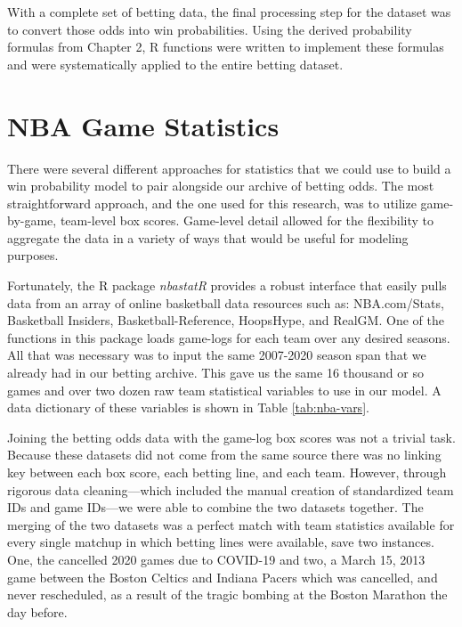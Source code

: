 \documentclass [MS] {uclathes}
\begin{document}
With a complete set of betting data, the final processing step for the dataset was to convert those odds into win probabilities. Using the derived probability formulas from Chapter 2, R functions were written to implement these formulas and were systematically applied to the entire betting dataset. 

\section{NBA Game Statistics}
There were several different approaches for statistics that we could use to build a win probability model to pair alongside our archive of betting odds. The most straightforward approach, and the one used for this research, was to utilize game-by-game, team-level box scores. Game-level detail allowed for the flexibility to aggregate the data in a variety of ways that would be useful for modeling purposes.

Fortunately, the R package \emph{nbastatR} provides a robust interface that easily pulls data from an array of online basketball data resources such as: NBA.com/Stats, Basketball Insiders, Basketball-Reference, HoopsHype, and RealGM. \cite{nbastatr} One of the functions in this package loads game-logs for each team over any desired seasons. All that was necessary was to input the same 2007-2020 season span that we already had in our betting archive. This gave us the same 16 thousand or so games and over two dozen raw team statistical variables to use in our model. A data dictionary of these variables is shown in Table \ref{tab:nba-vars}. 

Joining the betting odds data with the game-log box scores was not a trivial task. Because these datasets did not come from the same source there was no linking key between each box score, each betting line, and each team. However, through rigorous data cleaning---which included the manual creation of standardized team IDs and game IDs---we were able to combine the two datasets together. The merging of the two datasets was a perfect match with team statistics available for every single matchup in which betting lines were available, save two instances. One, the cancelled 2020 games due to COVID-19 and two, a March 15, 2013 game between the Boston Celtics and Indiana Pacers which was cancelled, and never rescheduled, as a result of the tragic bombing at the Boston Marathon the day before. \cite{si} 
\end{document}
